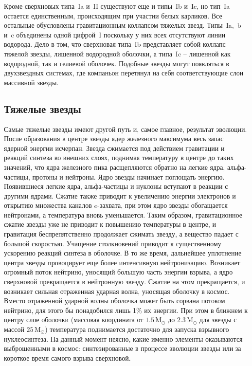\documentclass[a4paper, 14pt]{extarticle}
\def\M{\mathrm{M}_\odot}
\begin{document}
Кроме сверхновых типа~Ia и~II существуют еще и типы~Ib и~Ic, но тип~Ia 
остается единственным, происходящим при участии белых карликов. Все 
остальные обусловлены гравитационным коллапсом тяжелых звезд. Типы~Ia,~b 
и~c объединены одной цифрой~I поскольку у них всех отсутствуют линии 
водорода. Дело в том, что сверхновая типа~Ib представляет собой коллапс 
тяжелой звезды, лишенной водородной оболочки, а типа~Ic -- лишенной как 
водородной, так и гелиевой оболочек. Подобные звезды могут появляться 
в двухзвездных системах, где компаньон перетянул на себя соответствующие 
слои массивной звезды.


\subsection{Тяжелые звезды}

Самые тяжелые звезды имеют другой путь и, самое главное, результат 
эволюции. После образования в центре звезды ядер железного максимума 
весь запас ядерной энергии исчерпан. Звезда сжимается под действием 
гравитации и реакций синтеза во внешних слоях, поднимая температуру 
в центре до таких значений, что ядра железного пика расщепляются  
обратно на легкие ядра, альфа-частицы, протоны и нейтроны. Ядро звезды 
начинает поглощать энергию. Появившиеся легкие ядра, альфа-частицы 
и нуклоны вступают в реакции с другими ядрами. Сжатие также приводит 
к увеличению энергии электронов и открытию множества каналов 
$e$-захвата, при этом ядро звезды обогащается нейтронами, а температура 
вновь уменьшается. Таким образом, гравитационное сжатие звезды уже не 
приводит к повышению температуры в центре, и гравитация беспрепятственно 
продолжает сжимать звезду, а вещество падает с большой скоростью.  
Учащение столкновений приводит к существенному ускорению реакций синтеза 
в оболочке. В то же время, дальнейшее уплотнение центра звезды 
провоцирует еще более интенсивную нейтронизацию. Возникает огромный 
поток нейтрино, уносящий большую часть энергии взрыва, а ядро 
сверхновой превращается в нейтронную звезду. Сжатие на этом 
прекращается, и возникает сильная отраженная ударная волна, уносящая 
оболочку в космос. Вместо отраженной ударной волны оболочка может быть 
сорвана потоком нейтрино, для этого бы понадобился лишь 1\% их энергии. 
При этом в ближнем к центру слое оболочки (массовая координата от 
$1.5\,\M$ до $2.3\,\M$ для звезды с массой $25\,\M$) температура 
поднимается достаточно для запуска взрывного нуклеосинтеза. На данный 
момент неясно, какие именно элементы оказываются выброшенными в космос: 
синтезированные в процессе эволюции звезды или за короткое время самого 
взрыва сверхновой.
\end{document}
